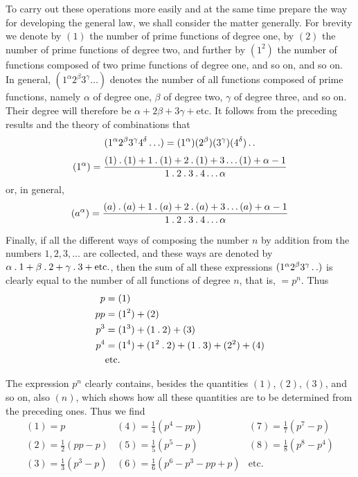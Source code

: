 To carry out these operations more easily and at the same time prepare the way for developing the general law, we shall consider the matter generally. For brevity we denote by $(1)$ the number of prime functions of degree one, by $(2)$ the number of prime functions of degree two, and further by $(1^2)$ the number of functions composed of two prime functions of degree one, and so on, and so on. In general, $(1^\alpha2^\beta3^\gamma\ldots)$ denotes the number of all functions composed of prime functions, namely $\alpha$ of degree one, $\beta$ of degree two, $\gamma$ of degree three, and so on. Their degree will therefore be $\alpha+2\beta+3\gamma+\text{etc.}$ It follows from the preceding results and the theory of combinations that
\[
(1^\alpha2^\beta3^\gamma4^\delta\ldots)=(1^\alpha)(2^\beta)(3^\gamma)(4^\delta)\mathinner{.\,.}
\]
\[
(1^\alpha)=\frac{(1)\mathbin{.}(1)+1\mathbin{.}(1)+2\mathbin{.}(1)+3\ldots(1)+\alpha-1}{1\mathbin{.}2\mathbin{.}3\mathbin{.}4\ldots\alpha}
\]
or, in general,
\[
(a^\alpha)=\frac{(a)\mathbin{.}(a)+1\mathbin{.}(a)+2\mathbin{.}(a)+3\ldots(a)+\alpha-1}{1\mathbin{.}2\mathbin{.}3\mathbin{.}4\ldots\alpha}
\]

Finally, if all the different ways of composing the number $n$ by addition from the numbers $1,2,3,\ldots$ are collected, and these ways are denoted by $\alpha\mathbin{.}1+\beta\mathbin{.}2+\gamma\mathbin{.}3+\text{etc.}$, then the sum of all these expressions $(1^\alpha2^\beta3^\gamma\mathinner{.\,.})$ is clearly equal to the number of all functions of degree $n$, that is, $=p^n$. Thus
\[
\begin{aligned}
p&=(1)\\
pp&=(1^2)+(2)\\
p^3&=(1^3)+(1\mathbin{.}2)+(3)\\
p^4&=(1^4)+(1^2\mathbin{.}2)+(1\mathbin{.}3)+(2^2)+(4)\\
&\text{etc.}
\end{aligned}
\]

The expression $p^n$ clearly contains, besides the quantities $(1),(2),(3)$, and so on,
also $(n)$, which shows how all these quantities are to be determined from the preceding ones. Thus we find
\[
\begin{array}{lll}
(1)=p&(4)=\frac14(p^4-pp)&(7)=\frac17(p^7-p)\\
(2)=\frac12(pp-p)&(5)=\frac15(p^5-p)&(8)=\frac18(p^8-p^4)\\
(3)=\frac13(p^3-p)&(6)=\frac16(p^6-p^3-pp+p)&\text{etc.}
\end{array}
\]

